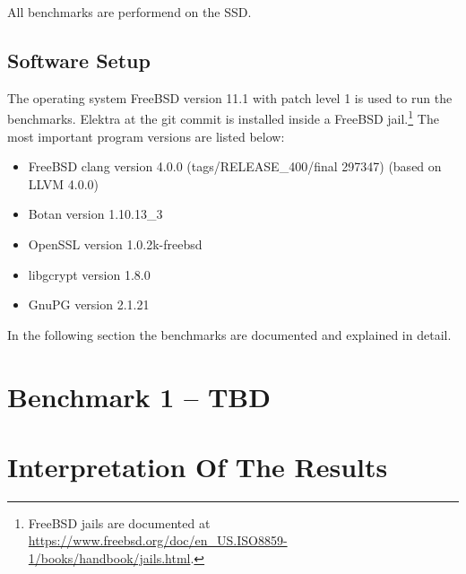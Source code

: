 All benchmarks are performend on the SSD.

  \subsection{Software Setup}

The operating system FreeBSD version 11.1 with patch level 1 is used to run the benchmarks.
Elektra  at the git commit  is installed inside a FreeBSD jail.\footnote{FreeBSD jails
are documented at \url{https://www.freebsd.org/doc/en_US.ISO8859-1/books/handbook/jails.html}.
}
The most important program versions are listed below:

\begin{itemize}
  \item FreeBSD clang version 4.0.0 (tags/RELEASE\_400/final 297347) (based on LLVM 4.0.0)
  \item Botan version 1.10.13\_3
  \item OpenSSL version 1.0.2k-freebsd
  \item libgcrypt version 1.8.0
  \item GnuPG version 2.1.21
\end{itemize}

In the following section the benchmarks are documented and explained in detail.

\section{Benchmark 1 -- TBD}

\section{Interpretation Of The Results}
